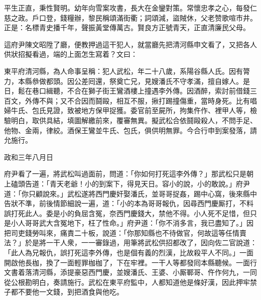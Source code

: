 \begin{myquote}
平生正直，秉性賢明。幼年向雪案攻書，長大在金鑾對策。常懷忠孝之心，每發仁慈之政。戶口登，錢糧辦，黎民稱頌滿街衢；詞頌減，盜賊休，父老赞歌喧市井。正是：名標青史播千年，聲振黃堂傳萬古。賢良方正號青天，正直清廉民父母。
\end{myquote}

這府尹陳文昭陞了廳，便教押過這干犯人，就當廳先把清河縣申文看了，又把各人供狀招擬看過，端的上面怎生寫着？文曰：

\begin{myquote}[\markfont]
東平府清河縣，為人命事呈稱：犯人武松，年二十八歲，系陽谷縣人氏。因有膂力，本縣叅做都頭。因公差囘還，祭奠亡兄，見嫂潘氏不守孝滿，擅自嫁人。是日，鬆在巷口緝聽，不合在獅子街王鸞酒樓上撞遇李外傳。因酒醉，索討前借錢三百文，{}外傳不與；又不合因而鬪毆，相互不服，揪打踢撞傷重，當時身死。比有唱婦牛氏、包氏見證，致被地方保甲捉獲。委官前至屍所，拘集仵作、裡甲人等，檢驗明白，取供具結，填圖解繳前來，覆審無異。擬武松合依鬪毆殺人，不問手足、他物、金兩，律絞。酒保王鸞並牛氏、包氏，俱供明無罪。今合行申到案發落，請允施行。

政和三年八月日


\end{myquote}

府尹看了一遍，將武松叫過面前，問道：「你如何打死這李外傳？」那武松只是朝上磕頭告道：「青天老爺！小的到案下，得見天日。容小的說，小的敢說。」府尹道：「你只顧說來。」武松遂將西門慶奸娶潘氏，並哥哥捉姦，踢中心窩，後來縣中告狀不準，前後情節細說一遍，道：「小的本為哥哥報仇，因尋西門慶厮打，不料誤打死此人。委是小的負屈含冤，奈西門慶錢大，禁他不得。小人死不足惜，但只是小人哥哥武大含冤地下，枉了性命。」府尹道：「你不消多言，我已盡知了。」因把司吏錢勞叫來，痛責二十板，說道：「你那知縣也不待做官，何故這等任情賣法？」於是將一干人衆，一一審錄過，用筆將武松供招都改了，因向佐二官說道：「此人為兄報仇，誤打死這李外傳，也是個有義的烈漢，比故殺平人不同。」一面開啟他長枷，換了一面輕罪枷枷了，下在牢裡。一干人等都發囘本縣聽候。一面行文書着落清河縣，添提豪惡西門慶，並嫂潘氏、王婆、小厮鄆哥、仵作何九，一同從公根勘明白，奏請施行。武松在東平府監中，人都知道他是條好漢，因此押牢禁子都不要他一文錢，到把酒食與他吃。


